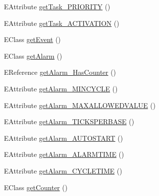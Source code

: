 \begin{DoxyCompactItemize}
\item 
E\-Attribute \hyperlink{classshootingmachineemfmodel_1_1impl_1_1_shootingmachineemfmodel_package_impl_aaf90279a00d93514e8cf819b89f6c00c}{get\-Task\-\_\-\-P\-R\-I\-O\-R\-I\-T\-Y} ()
\item 
E\-Attribute \hyperlink{classshootingmachineemfmodel_1_1impl_1_1_shootingmachineemfmodel_package_impl_a7334e1d16b72a399d322fc9e532a0c4c}{get\-Task\-\_\-\-A\-C\-T\-I\-V\-A\-T\-I\-O\-N} ()
\item 
E\-Class \hyperlink{classshootingmachineemfmodel_1_1impl_1_1_shootingmachineemfmodel_package_impl_ab8a65c25b50ad542b99ae48c8e84e808}{get\-Event} ()
\item 
E\-Class \hyperlink{classshootingmachineemfmodel_1_1impl_1_1_shootingmachineemfmodel_package_impl_aae7572a42a9d2658df63f0aea15ccf62}{get\-Alarm} ()
\item 
E\-Reference \hyperlink{classshootingmachineemfmodel_1_1impl_1_1_shootingmachineemfmodel_package_impl_a3ac05d66a8805cddf8ae874c09f9a106}{get\-Alarm\-\_\-\-Has\-Counter} ()
\item 
E\-Attribute \hyperlink{classshootingmachineemfmodel_1_1impl_1_1_shootingmachineemfmodel_package_impl_a6fcf4557f3a7bbade4f09afd712e779f}{get\-Alarm\-\_\-\-M\-I\-N\-C\-Y\-C\-L\-E} ()
\item 
E\-Attribute \hyperlink{classshootingmachineemfmodel_1_1impl_1_1_shootingmachineemfmodel_package_impl_af52bb3dd83b5d12f47bca6fd21c36259}{get\-Alarm\-\_\-\-M\-A\-X\-A\-L\-L\-O\-W\-E\-D\-V\-A\-L\-U\-E} ()
\item 
E\-Attribute \hyperlink{classshootingmachineemfmodel_1_1impl_1_1_shootingmachineemfmodel_package_impl_a4d5770a312feb087f78df8bdd6a0af33}{get\-Alarm\-\_\-\-T\-I\-C\-K\-S\-P\-E\-R\-B\-A\-S\-E} ()
\item 
E\-Attribute \hyperlink{classshootingmachineemfmodel_1_1impl_1_1_shootingmachineemfmodel_package_impl_a511d9b7e7efe9d7bbc589a8eef1ac6b0}{get\-Alarm\-\_\-\-A\-U\-T\-O\-S\-T\-A\-R\-T} ()
\item 
E\-Attribute \hyperlink{classshootingmachineemfmodel_1_1impl_1_1_shootingmachineemfmodel_package_impl_a63aa784760a93bc30f7f1b551abc54f6}{get\-Alarm\-\_\-\-A\-L\-A\-R\-M\-T\-I\-M\-E} ()
\item 
E\-Attribute \hyperlink{classshootingmachineemfmodel_1_1impl_1_1_shootingmachineemfmodel_package_impl_aa5fdd358ec3c0796dea73cfb2283f896}{get\-Alarm\-\_\-\-C\-Y\-C\-L\-E\-T\-I\-M\-E} ()
\item 
E\-Class \hyperlink{classshootingmachineemfmodel_1_1impl_1_1_shootingmachineemfmodel_package_impl_a4cc5fbe52e9a40ce34ed89a9eeeb5b29}{get\-Counter} ()

\end{DoxyCompactItemize}
